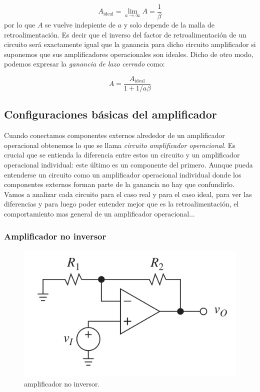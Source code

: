 \documentclass[12pt,a4paper]{article}
\numberwithin{equation}{section}
\numberwithin{figure}{section}
\begin{document}
\begin{equation}
A_{\mathrm{ideal}} = \lim_{a \rightarrow \infty} A = \dfrac{1}{\beta}
\end{equation}
por lo que $A$ se vuelve indepiente de $a$ y solo depende de la malla de retroalimentación. Es decir que el inverso del factor de retroalimentación de un circuito será exactamente igual que la ganancia para dicho circuito amplificador si suponemos que sus amplificadores operacionales son ideales. Dicho de otro modo, podemos expresar la \textit{ganancia de lazo cerrado} como:

\begin{equation}
A = \dfrac{A_{\mathrm{ideal}}}{1+1/a\beta}
\end{equation}


\subsection{Configuraciones básicas del amplificador \label{Subsec:1.3}} 

Cuando conectamos componentes externos alrededor de un amplificador operacional obtenemos lo que se llama \textit{circuito amplificador operacional}. Es crucial que se entienda la diferencia entre estos un circuito y un amplificador operacional individual: este último es un componente del primero. Aunque pueda entenderse un circuito como un amplificador operacional individual donde los componentes externos forman parte de la ganancia no hay que confundirlo. \\

Vamos a analizar cada circuito para el caso real y para el caso ideal, para ver las diferencias y para luego poder entender mejor que es la retroalimentación, el comportamiento mas general de un amplificador operacional...

\subsubsection{Amplificador no inversor}

\begin{figure}[h!] \centering
\includegraphics[scale=0.25]{1.3-Amplificador-inversor.png}
\caption{amplificador no inversor.}
\label{Fig:1.3-Amplificador-inversor}
\end{figure}
\end{document}
